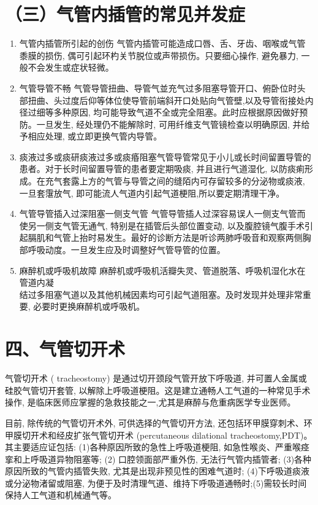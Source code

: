 \documentclass[10pt]{article}
\begin{document}
\section*{（三）气管内插管的常见并发症}
\begin{enumerate}
  \item 气管内插管所引起的创伤 气管内插管可能造成口唇、舌、牙齿、咽喉或气管黍膜的损伤, 偶可引起环杓关节脱位或声带损伤。只要细心操作, 避免暴力, 一般不会发生或症状轻微。

  \item 气管导管不畅 气管导管扭曲、导管气並充气过多阻塞导管开口、俯卧位时头部扭曲、头过度后仰等体位使导管前端斜开口处贴向气管壁,以及导管衔接处内径过细等多种原因, 均可能导致气道不全或完全阻塞。此时应根据原因做好预防。一旦发生, 经处理仍不能解除时, 可用纤维支气管镜检查以明确原因, 并给予相应处理, 或立即更换气管内导管。

  \item 痰液过多或痰研痰液过多或痰痻阻塞气管导管常见于小儿或长时间留置导管的患者。对于长时间留置导管的患者要定期吸痰, 并且进行气道湿化, 以防痰痢形成。在充气套露上方的气管与导管之间的缝陌内可存留较多的分泌物或痰液, 一旦套霮放气, 即可能流人气道内引起气道梗阻,所以要定期清理干净。

  \item 气管导管插入过深阻塞一侧支气管 气管导管插人过深容易误人一侧支气管而使另一侧支气管无通气, 特别是在插管后头部位置变动, 以及腹腔镜气腹手术引起膈肌和气管上抬时易发生。最好的诊断方法是听诊两肺呼吸音和观察两侧胸部呼吸动度。一旦发生应及时调整好气管导管的位置。

  \item 麻醉机或呼吸机故障 麻醉机或呼吸机活瓣失灵、管道脱落、呼吸机湿化水在管道内凝\\
结过多阻塞气道以及其他机械因素均可引起气道阻塞。及时发现并处理非常重要, 必要时更换麻醉机或呼吸机。

\end{enumerate}

\section*{四、气管切开术}
气管切开术 ( tracheostomy) 是通过切开颈段气管开放下呼吸道, 并可置人金属或硅胶气管切开套管, 以解除上呼吸道梗阻。这是建立通畅人工气道的一种常见手术操作, 是临床医师应掌握的急救技能之一,尤其是麻醉与危重病医学专业医师。

目前, 除传统的气管切开术外, 可供选择的气管切开方法, 还包括环甲膜穿刺术、环甲膜切开术和经皮扩张气管切开术 (percutaneous dilational tracheostomy,PDT)。其主要适应证包括: (1)各种原因所致的急性上呼吸道梗阻, 如急性喉炎、严重喉痉挛和上呼吸道异物阻塞等; (2) 口腔领面部严重外伤, 无法行气管内插管者; (3)各种原因所致的气管内插管失败, 尤其是出现非预见性的困难气道时; (4)下呼吸道痰液或分泌物渚留或阻塞, 为便于及时清理气道、维持下呼吸道通畅时;(5)需较长时间保持人工气道和机械通气等。
\end{document}
